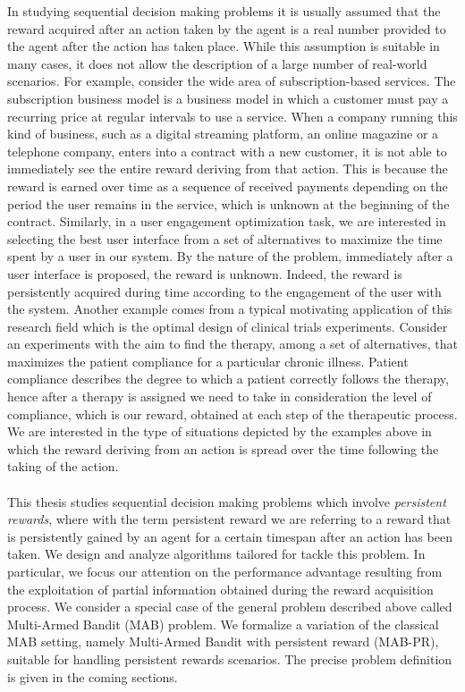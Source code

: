 In studying sequential decision making problems it is usually assumed that the reward acquired after an action taken by the agent is a real number provided to the agent after the action has taken place. While this assumption is suitable in many cases, it does not allow the description of a large number of real-world scenarios. For example, consider the wide area of subscription-based services. The subscription business model is a business model in which a customer must pay a recurring price at regular intervals to use a service. When a company running this kind of business, such as a  digital streaming platform, an online magazine or a telephone company, enters into a contract with a new customer, it is not able to immediately see the entire reward deriving from that action. This is because the reward is earned over time as a sequence of received payments depending on the period the user remains in the service, which is unknown at the beginning of the contract. Similarly, in a user engagement optimization task, we are interested in selecting the best user interface from a set of alternatives to maximize the time spent by a user in our system. By the nature of the problem, immediately after a user interface is proposed, the reward is unknown. Indeed, the reward is persistently acquired during time according to the engagement of the user with the system. Another example comes from a typical motivating application of this research field which is the optimal design of clinical trials experiments. Consider an experiments with the aim to find the therapy, among a set of alternatives, that maximizes the patient compliance for a particular chronic illness. Patient compliance describes the degree to which a patient correctly follows the therapy, hence after a therapy is assigned we need to take in consideration the level of compliance, which is our reward, obtained at each step of the therapeutic process. We are interested in the type of situations depicted by the examples above in which the reward deriving from an action is spread over the time following the taking of the action.
\\\\
This thesis studies sequential decision making problems which involve \emph{persistent rewards}, where with the term persistent reward we are referring to a reward that is persistently gained by an agent for a certain timespan after an action has been taken. We design and analyze algorithms tailored for tackle this problem. In particular, we focus our attention on the performance advantage resulting from the exploitation of partial information obtained during the reward acquisition process.
We consider a special case of the general problem described above called Multi-Armed Bandit (MAB) problem. We formalize a variation of the classical MAB setting, namely Multi-Armed Bandit with persistent reward (MAB-PR), suitable for handling persistent rewards scenarios. The precise problem definition is given in the coming sections.
\\\\









